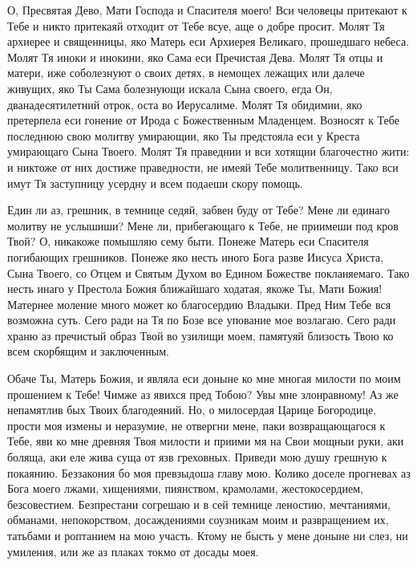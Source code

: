 \begin{mymulticols}


О, Пресвятая Дево, Мати Господа и Спасителя моего! Вси человецы притекают к Тебе и никто притекаяй отходит от Тебе всуе, аще о добре просит. Молят Тя архиерее и священницы, яко Матерь еси Архиерея Великаго, прошедшаго небеса. Молят Тя иноки и инокини, яко Сама еси Пречистая Дева. Молят Тя отцы и матери, иже соболезнуют о своих детях, в немощех лежащих или далече живущих, яко Ты Сама болезнующи искала Сына своего, егда Он, дванадесятилетний отрок, оста во Иерусалиме. Молят Тя обидимии, яко претерпела еси гонение от Ирода с Божественным Младенцем. Возносят к Тебе последнюю свою молитву умирающии, яко Ты предстояла еси у Креста умирающаго Сына Твоего. Молят Тя праведнии и вси хотящии благочестно жити: и никтоже от них достиже праведности, не имеяй Тебе молитвенницу. Тако вси имут Тя заступницу усердну и всем подаеши скору помощь.

Един ли аз, грешник, в темнице седяй, забвен буду от Тебе? Мене ли единаго молитву не услышиши? Мене ли, прибегающаго к Тебе, не приимеши под кров Твой? О, никакоже помышляю сему быти. Понеже Матерь еси Спасителя погибающих грешников. Понеже яко несть иного Бога разве Иисуса Христа, Сына Твоего, со Отцем и Святым Духом во Едином Божестве покланяемаго. Тако несть инаго у Престола Божия ближайшаго ходатая, якоже Ты, Мати Божия! Матернее моление много может ко благосердию Владыки. Пред Ним Тебе вся возможна суть. Сего ради на Тя по Бозе все упование мое возлагаю. Сего ради храню аз пречистый образ Твой во узилищи моем, памятуяй близость Твою ко всем скорбящим и заключенным. 

Обаче Ты, Матерь Божия, и являла еси доныне ко мне многая милости по моим прошением к Тебе! Чимже аз явихся пред Тобою? Увы мне злонравному! Аз же непамятлив бых Твоих благодеяний. Но, о милосердая Царице Богородице, прости моя измены и неразумие, не отвергни мене, паки возвращающагося к Тебе, яви ко мне древняя Твоя милости и приими мя на Свои мощныи руки, аки боляща, аки еле жива суща от язв греховных. Приведи мою душу грешную к покаянию. Беззакония бо моя превзыдоша главу мою. Колико доселе прогневах аз Бога моего лжами, хищениями, пиянством, крамолами, жестокосердием, безсовестием. Безпрестани согрешаю и в сей темнице леностию, мечтаниями, обманами, непокорством, досаждениями соузникам моим и развращением их, татьбами и роптанием на мою участь. Ктому не бысть у мене доныне ни слез, ни умиления, или же аз плаках токмо от досады моея. 


\end{mymulticols}
